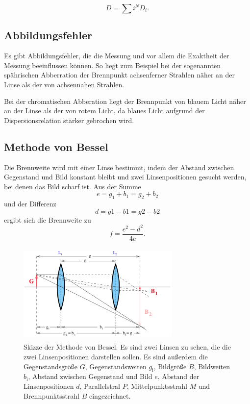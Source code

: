 \begin{equation*}
    D= \sum{i}^N D_i.
    \label{eqn:brechungskraft}
\end{equation*}


\subsection{Abbildungsfehler}
Es gibt Abbildungsfehler, die die Messung und vor allem die Exaktheit der Messung beeinflussen können. So liegt zum Beispiel bei der sogenannten spährischen Abberration der Brennpunkt achsenferner Strahlen näher an der Linse als der von achsennahen Strahlen. 

\noindent Bei der chromatischen Abberation liegt der Brennpunkt von blauem Licht näher an der Linse als der von rotem Licht, da blaues Licht aufgrund der Dispersionsrelation stärker gebrochen wird.  


\subsection{Methode von Bessel}
Die Brennweite wird mit einer Linse bestimmt, indem der Abstand zwischen Gegenstand und Bild konstant bleibt und zwei Linsenpositionen gesucht werden, bei denen das Bild scharf ist. Aus der Summe 
\begin{equation}
    e = g_1 + b_1 = g_2 + b_2
    \label{eqn:e}
\end{equation}
und der Differenz 
\begin{equation}
    d = g1- b1 = g2 - b2
    \label{eqn:d}
\end{equation}
ergibt sich die Brennweite zu
\begin{equation}
    f = \frac{e^2 - d^2}{4 e}.
    \label{eqn:fbessel}
\end{equation} 

\begin{figure}
    \centering
    \includegraphics[width=8cm, height=5cm]{build/bessel.png}
    \caption{Skizze der Methode von Bessel. Es sind zwei Linsen zu sehen, die die zwei Linsenpositionen darstellen sollen. Es sind außerdem die Gegenstandsgröße $G$, Gegenstandsweiten $g_\text{i}$, Bildgröße $B$, Bildweiten $b_\text{i}$, Abstand zwischen Gegenstand und Bild $e$, Abstand der Linsenpositionen $d$, Parallelstral $P$, Mittelpunktsstrahl $M$ und Brennpunktsstrahl $B$ eingezeichnet. \cite{V408}}
    \label{fig:bessel}
\end{figure}

